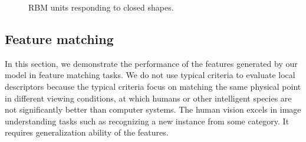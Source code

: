 \documentclass[twocolumn]{article}
\begin{document}
\begin{figure}[!t]
\centering
{}\hfil
{}\hfil
{}
\caption{RBM units responding to closed shapes.}
\label{fig:10}
\end{figure}

\subsection{Feature matching}

In this section, we demonstrate the performance of the features generated by our model in feature matching tasks.
We do not use typical criteria to evaluate local descriptors \cite{mikolajczyk2005}
because the typical criteria focus on matching the same physical point in different viewing conditions,
at which humans or other intelligent species are not significantly better than computer systems.
The human vision excels in image understanding tasks such as recognizing a new instance from some category.
It requires generalization ability of the features.
\end{document}
